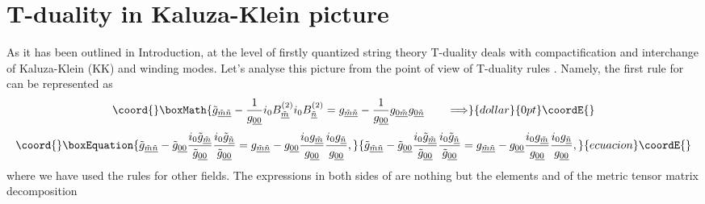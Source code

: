 \documentclass[a4paper,11pt]{article}
\begin{document}
\section{T-duality in Kaluza-Klein picture}

As it has been outlined in Introduction,
at the level of firstly quantized string theory T-duality deals
with compactification and interchange of Kaluza-Klein (KK) and winding
modes. Let's analyse this picture from the point of view of T-duality
rules . Namely, the first rule for \coordHE{} can be represented as
$$\coord{}\boxMath{
\tilde{g}_{\underline{\tilde m}\underline{\tilde n}}
-{1\over g_{\underline{00}}}i_0 B^{(2)}_{\underline{\tilde m}}
i_0 B^{(2)}_{\underline{\tilde n}}=g_{\underline{\tilde m}\underline{\tilde n}}
-{1\over g_{\underline{00}}}g_{\underline{0}\underline{\tilde m}}
g_{\underline{0}\underline{\tilde n}} \qquad  \Longrightarrow
}{dollar}{0pt}\coordE{}$$
\begin{equation}\coord{}\boxEquation{\plabel{TRg1}
\tilde{g}_{\underline{\tilde m}\underline{\tilde n}}
-\tilde{g}_{\underline{00}}{i_0 \tilde{g}_{\underline{\tilde m}}\over
\tilde{g}_{\underline{00}}}
{i_0 \tilde{g}_{\underline{\tilde n}}\over
\tilde{g}_{\underline{00}}}=g_{\underline{\tilde m}\underline{\tilde n}}
-g_{\underline{00}} {i_0 g_{\underline{\tilde m}}\over
g_{\underline{00}}}
{i_0 g_{\underline{\tilde n}}\over
g_{\underline{00}}},
}{\tilde{g}_{\underline{\tilde m}\underline{\tilde n}}
-\tilde{g}_{\underline{00}}{i_0 \tilde{g}_{\underline{\tilde m}}\over
\tilde{g}_{\underline{00}}}
{i_0 \tilde{g}_{\underline{\tilde n}}\over
\tilde{g}_{\underline{00}}}=g_{\underline{\tilde m}\underline{\tilde n}}
-g_{\underline{00}} {i_0 g_{\underline{\tilde m}}\over
g_{\underline{00}}}
{i_0 g_{\underline{\tilde n}}\over
g_{\underline{00}}},
}{ecuacion}\coordE{}\end{equation}
where we have used the rules for other fields. The expressions in both sides
of  are nothing but the elements \coordHE{} and \coordHE{} of the metric tensor matrix decomposition
\end{document}
